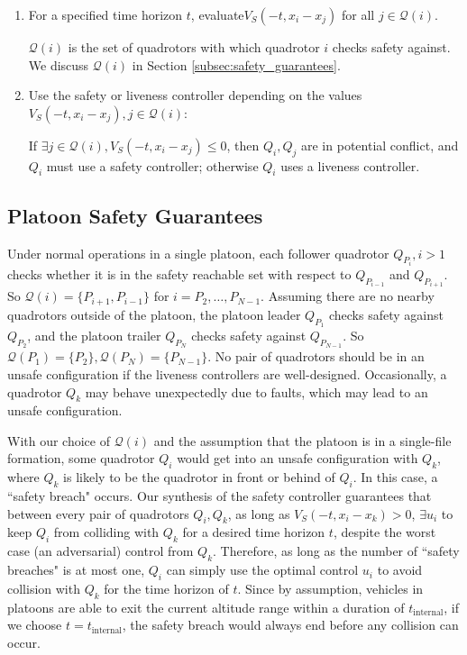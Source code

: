 \begin{enumerate}
\item For a specified time horizon $t$, evaluate$V_S(-t,x_i-x_j)$ for all $j\in \mathcal{Q}(i)$.

$\mathcal{Q}(i)$ is the set of quadrotors with which quadrotor $i$ checks safety against. We discuss $\mathcal{Q}(i)$ in Section \ref{subsec:safety_guarantees}.

\item Use the safety or liveness controller depending on the values $V_S(-t,x_i-x_j),j\in \mathcal{Q}(i)$: 

If $\exists j\in \mathcal{Q}(i),V_S(-t,x_i-x_j)\le 0$, then $Q_i,Q_j$ are in potential conflict, and $Q_i$ must use a safety controller; otherwise $Q_i$ uses a liveness controller.
\end{enumerate}

\subsection{Platoon Safety Guarantees \label{subsec:safety_guarantees}}
Under normal operations in a single platoon, each follower quadrotor $Q_{P_i},i>1$ checks whether it is in the safety reachable set with respect to $Q_{P_{i-1}}$ and $Q_{P_{i+1}}$. So $\mathcal{Q}(i) = \{P_{i+1}, P_{i-1}\}$ for $i=P_2,\ldots,P_{N-1}$. Assuming there are no nearby quadrotors outside of the platoon, the platoon leader $Q_{P_1}$ checks safety against $Q_{P_2}$, and the platoon trailer $Q_{P_N}$ checks safety against $Q_{P_{N-1}}$. So $\mathcal{Q}(P_1)=\{P_2\}, \mathcal{Q}(P_N)=\{P_{N-1}\}$. No pair of quadrotors should be in an unsafe configuration if the liveness controllers are well-designed. Occasionally, a quadrotor $Q_k$ may behave unexpectedly due to faults, which may lead to an unsafe configuration.

With our choice of $\mathcal{Q}(i)$ and the assumption that the platoon is in a single-file formation, some quadrotor $Q_i$ would get into an unsafe configuration with $Q_k$, where $Q_k$ is likely to be the quadrotor in front or behind of $Q_i$. In this case, a ``safety breach" occurs. Our synthesis of the safety controller guarantees that between every pair of quadrotors $Q_i,Q_k$, as long as $V_S(-t,x_i- x_k)>0$, $\exists u_i$ to keep $Q_i$ from colliding with $Q_k$ for a desired time horizon $t$, despite the worst case (an adversarial) control from $Q_k$. Therefore, as long as the number of ``safety breaches" is at most one, $Q_i$ can simply use the optimal control $u_i$ to avoid collision with $Q_k$ for the time horizon of $t$. Since by assumption, vehicles in platoons are able to exit the current altitude range within a duration of $t_\text{internal}$, if we choose $t=t_\text{internal}$, the safety breach would always end before any collision can occur. 

